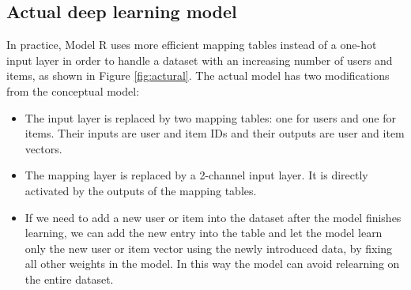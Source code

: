 \documentclass[sigconf]{acmart}
\begin{document}
\subsection{Actual deep learning model}
In practice, Model R uses more efficient mapping tables instead of a 
one-hot input layer in order to handle a dataset with an increasing number of 
users and items, as shown in Figure \ref{fig:actural}.
The actual model has two modifications from the conceptual model:
\begin{itemize}
	\item The input layer is replaced by two mapping tables: one for users and 
	one for items.
	Their inputs are user and item IDs and their outputs are user and item 
	vectors.
	\item The mapping layer is replaced by a 2-channel input layer. It is 
	directly activated by the outputs of the mapping tables.
	\item If we need to add a new user or item into the dataset
	after the model finishes learning,
	we can add the new entry into the table and let the model learn
	only the new user or item vector using the newly introduced data,
	by fixing all other weights in the model.
	In this way the model can avoid relearning on the entire dataset.
\end{itemize}
\end{document}
